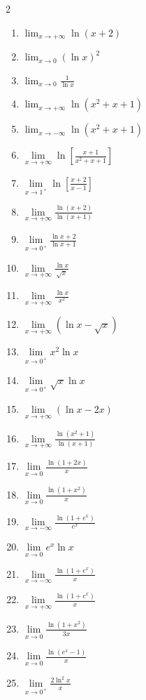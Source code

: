 \documentclass[12pt,a4paper]{article}
\begin{document}
\begin{multicols}{2}
\setlength{\columnseprule}{0.1mm} %
\begin{enumerate}
\item $\lim_{x \to +\infty} \ln(x+2)$
\item $ \lim_{x \to 0} (\ln x)^2 $
\item $ \lim_{x \to 0} \frac{1}{\ln x} $
\item $ \lim_{x \to +\infty} \ln(x^2 + x + 1) $ 
\item $ \lim_{x \to -\infty} \ln(x^2 + x + 1) $



\item $ \lim\limits_{x \to +\infty} \ln\left[ \frac{x+1}{x^2 + x + 1}\right]$
\item $ \lim\limits_{x \to 1^+} \ln\left[ \frac{x+2}{x-1}\right]  $
\item $ \lim\limits_{x \to +\infty} \frac{\ln(x+2)}{\ln(x+1)} $
\item $ \lim\limits_{x \to 0^+} \frac{\ln x+2}{\ln x+1} $
\item $ \lim\limits_{x \to +\infty} \frac{\ln x}{\sqrt{x}} $


\item $ \lim\limits_{x \to +\infty} \frac{\ln x}{x^2} $
\item $ \lim\limits_{x \to +\infty} (\ln x - \sqrt{x}) $
\item $ \lim\limits_{x \to 0^+} x^2 \ln x $
\item $ \lim\limits_{x \to 0^+} \sqrt{x} \ln x $
\item $ \lim\limits_{x \to +\infty} (\ln x - 2x) $

\item $ \lim\limits_{x \to +\infty} \frac{\ln(x^2 + 1)}{\ln(x+1)} $ 
\item $ \lim\limits_{x \to 0} \frac{\ln(1 + 2x)}{x} $
\item $ \lim\limits_{x \to 0} \frac{\ln(1 + x^2)}{x} $
\item $ \lim\limits_{x \to -\infty} \frac{\ln(1 + e^x)}{e^x} $
\item $ \lim\limits_{x \to 0} e^x \ln x $

 
\item $ \lim\limits_{x \to -\infty} \frac{\ln(1 + e^x)}{x} $
\item $ \lim\limits_{x \to +\infty} \frac{\ln(1 + e^x)}{x} $
\item $ \lim\limits_{x \to 0} \frac{\ln(1 + x^2)}{3x} $
\item $ \lim\limits_{x \to 0} \frac{\ln(e^x - 1)}{x} $
\item $ \lim\limits_{x \to 0^+} \frac{2\ln^2 x}{x} $




\end{enumerate}
\end{multicols}
\end{document}
